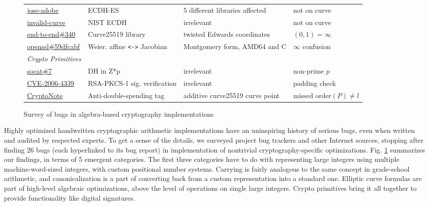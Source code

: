 \documentclass[conference,letterpaper]{IEEEtran}
\begin{document}
\begin{figure*}
\begin{tabular}{llll}
 \href{https://blogs.adobe.com/security/2017/03/critical-vulnerability-uncovered-in-json-encryption.html}{jose-adobe} & ECDH-ES & 5 different libraries affected & not on curve\\
 \href{http://euklid.org/pdf/ECC_Invalid_Curve.pdf}{invalid-curve} & NIST ECDH & irrelevant & not on curve\\
 \href{https://github.com/google/end-to-end/issues/340}{end-to-end\#340} & Curve25519 library & twisted Edwards coordinates & $(0, 1) = \infty$\\
 \href{https://git.openssl.org/gitweb/?p=openssl.git;a=commitdiff;h=e3057a57caf4274ea1fb074518e4714059dfcabf;ds=sidebyside}{openssl\#59dfcabf} & Weier. affine \texttt{<->} Jacobian &  Montgomery form, AMD64 and C & $\infty$ confusion\\
    \hline \emph{Crypto Primitives} \\ \hline
 \href{http://www.dest-unreach.org/socat/contrib/socat-secadv7.html}{socat\#7} & DH in Z*p & irrelevant & non-prime $p$\\
 \href{https://web.archive.org/web/20071010042708/http://www.imc.org/ietf-openpgp/mail-archive/msg14307.html}{CVE-2006-4339} & RSA-PKCS-1 sig. verification & irrelevant & padding check\\
 \href{https://getmonero.org/2017/05/17/disclosure-of-a-major-bug-in-cryptonote-based-currencies.html}{CryptoNote}
    & Anti-double-spending tag &  additive curve25519 curve point & missed order$(P) \neq l$\\
  \end{tabular}
  \caption{Survey of bugs in algebra-based cryptography implementations}\label{bugs}
\end{figure*}

Highly optimized handwritten cryptographic arithmetic implementations have an uninspiring history of serious bugs, even when written and audited by respected experts.
To get a sense of the details, we surveyed project bug trackers and other Internet sources, stopping after finding 26 bugs (each hyperlinked to its bug report) in implementation of nontrivial cryptography-specific optimizations.
Fig. \ref{bugs} summarizes our findings, in terms of 5 emergent categories.
The first three categories have to do with representing large integers using multiple machine-word-sized integers, with custom positional number systems.
Carrying is fairly analogous to the same concept in grade-school arithmetic, and canonicalization is a part of converting back from a custom representation into a standard one.
Elliptic curve formulas are part of high-level algebraic optimizations, above the level of operations on single large integers.
Crypto primitives bring it all together to provide functionality like digital signatures.
\end{document}
